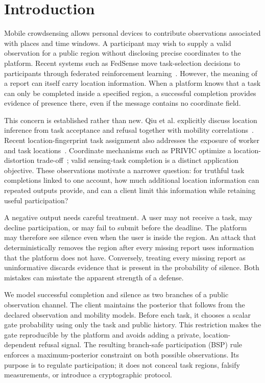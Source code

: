 \documentclass[3p,times]{elsarticle}
\begin{document}
\section{Introduction}
Mobile crowdsensing allows personal devices to contribute observations associated with places and time windows. A participant may wish to supply a valid observation for a public region without disclosing precise coordinates to the platform. Recent systems such as FedSense move task-selection decisions to participants through federated reinforcement learning~\cite{fedsense2025}. However, the meaning of a report can itself carry location information. When a platform knows that a task can only be completed inside a specified region, a successful completion provides evidence of presence there, even if the message contains no coordinate field.

This concern is established rather than new. Qiu et al. explicitly discuss location inference from task acceptance and refusal together with mobility correlations~\cite{tmarkov}. Recent location-fingerprint task assignment also addresses the exposure of worker and task locations~\cite{fingerprint}. Coordinate mechanisms such as PRIVIC optimize a location-distortion trade-off~\cite{privic2024}; valid sensing-task completion is a distinct application objective. These observations motivate a narrower question: for truthful task completions linked to one account, how much additional location information can repeated outputs provide, and can a client limit this information while retaining useful participation?

A negative output needs careful treatment. A user may not receive a task, may decline participation, or may fail to submit before the deadline. The platform may therefore see silence even when the user is inside the region. An attack that deterministically removes the region after every missing report uses information that the platform does not have. Conversely, treating every missing report as uninformative discards evidence that is present in the probability of silence. Both mistakes can misstate the apparent strength of a defense.

We model successful completion and silence as two branches of a public observation channel. The client maintains the posterior that follows from the declared observation and mobility models. Before each task, it chooses a scalar gate probability using only the task and public history. This restriction makes the gate reproducible by the platform and avoids adding a private, location-dependent refusal signal. The resulting branch-safe participation (BSP) rule enforces a maximum-posterior constraint on both possible observations. Its purpose is to regulate participation; it does not conceal task regions, falsify measurements, or introduce a cryptographic protocol.
\end{document}
